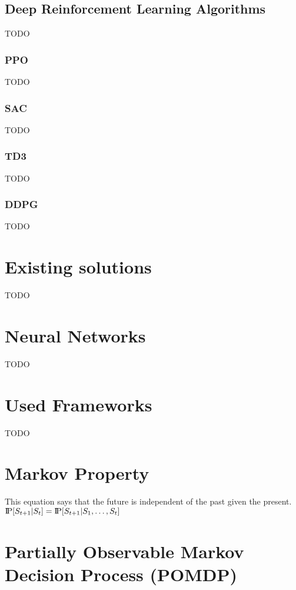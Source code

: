\subsection{Deep Reinforcement Learning Algorithms}\label{subsec:deep-reinforcement-learning-algorithms}
TODO

\subsubsection{PPO}
TODO

\subsubsection{SAC}
TODO

\subsubsection{TD3}
TODO

\subsubsection{DDPG}
TODO


\section{Existing solutions}\label{sec:existing-solutions}
TODO


\section{Neural Networks}\label{sec:neural-networks}
TODO


\section{Used Frameworks}\label{sec:used-frameworks}
TODO


\section{Markov Property}
This equation says that the future is independent of the past given the present.
$\text{I\kern-0.15em P}[S_{t+1}|S_t] = \text{I\kern-0.15em P}[S_{t+1}|S_1,\ldots,S_t]$


\section{Partially Observable Markov Decision Process (POMDP)}

